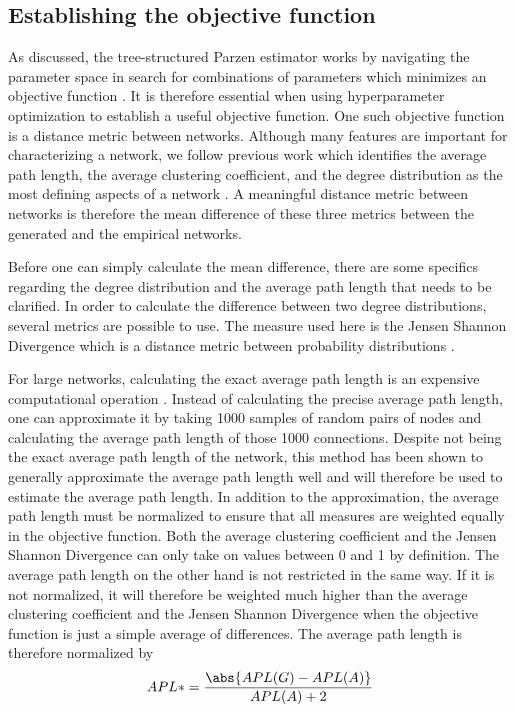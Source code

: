 \documentclass[11pt]{article}
\DeclarePairedDelimiter{\abs}\lvert\rvert
\begin{document}
\subsection{Establishing the objective function}
As discussed, the tree-structured Parzen estimator works by navigating the parameter space in search for combinations of parameters which minimizes an objective function \cite{akiba_optuna_2019}. It is therefore essential when using hyperparameter optimization to establish a useful objective function. One such objective function is a distance metric between networks. Although many features are important for characterizing a network, we follow previous work which identifies the average path length, the average clustering coefficient, and the degree distribution as the most defining aspects of a network \cite{jacksonsearch2004, jacksonmeeting2007}. A meaningful distance metric between networks is therefore the mean difference of these three metrics between the generated and the empirical networks.

\noindent Before one can simply calculate the mean difference, there are some specifics regarding the degree distribution and the average path length that needs to be clarified.
In order to calculate the difference between two degree distributions, several metrics are possible to use. The measure used here is the Jensen Shannon Divergence which is a distance metric between probability distributions \cite{fuglede_jensen-shannon_2004}. 

For large networks, calculating the exact average path length is an expensive computational operation  \cite{matsumura_average_2018}. Instead of calculating the precise average path length, one can approximate it by taking 1000 samples of random pairs of nodes and calculating the average path length of those 1000 connections. Despite not being the exact average path length of the network, this method has been shown to generally approximate the average path length well \cite{matsumura_average_2018} and will therefore be used to estimate the average path length. 
In addition to the approximation, the average path length must be normalized to ensure that all measures are weighted equally in the objective function. Both the average clustering coefficient and the Jensen Shannon Divergence can only take on values between 0 and 1 by definition. The average path length on the other hand is not restricted in the same way. If it is not normalized, it will therefore be weighted much higher than the average clustering coefficient and the Jensen Shannon Divergence when the objective function is just a simple average of differences. The average path length is therefore normalized by 
\vspace{3mm}
$$APL* = \frac{\abs{APL(G) - APL(A)}}{APL(A)+2}$$
\end{document}

